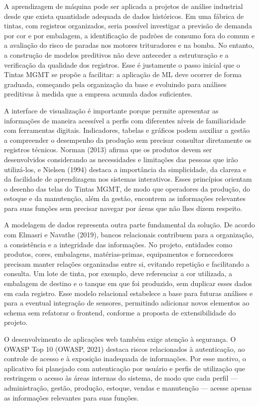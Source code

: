 \documentclass[12pt,a4paper]{article}
\begin{document}
A aprendizagem de máquina pode ser aplicada a projetos de análise industrial desde que exista quantidade adequada de dados históricos. Em uma fábrica de tintas, com registros organizados, seria possível investigar a previsão de demanda por cor e por embalagem, a identificação de padrões de consumo fora do comum e a avaliação do risco de paradas nos motores trituradores e na bomba. No entanto, a construção de modelos preditivos não deve anteceder a estruturação e a verificação da qualidade dos registros. Esse é justamente o passo inicial que o Tintas MGMT se propõe a facilitar: a aplicação de ML deve ocorrer de forma graduada, começando pela organização da base e evoluindo para análises preditivas à medida que a empresa acumula dados suficientes.

A interface de visualização é importante porque permite apresentar as informações de maneira acessível a perfis com diferentes níveis de familiaridade com ferramentas digitais. Indicadores, tabelas e gráficos podem auxiliar a gestão a compreender o desempenho da produção sem precisar consultar diretamente os registros técnicos. Norman (2013) afirma que os produtos devem ser desenvolvidos considerando as necessidades e limitações das pessoas que irão utilizá-los, e Nielsen (1994) destaca a importância da simplicidade, da clareza e da facilidade de aprendizagem nos sistemas interativos. Esses princípios orientam o desenho das telas do Tintas MGMT, de modo que operadores da produção, do estoque e da manutenção, além da gestão, encontrem as informações relevantes para suas funções sem precisar navegar por áreas que não lhes dizem respeito.

A modelagem de dados representa outra parte fundamental da solução. De acordo com Elmasri e Navathe (2019), bancos relacionais contribuem para a organização, a consistência e a integridade das informações. No projeto, entidades como produtos, cores, embalagens, matérias-primas, equipamentos e fornecedores precisam manter relações organizadas entre si, evitando repetição e facilitando a consulta. Um lote de tinta, por exemplo, deve referenciar a cor utilizada, a embalagem de destino e o tanque em que foi produzido, sem duplicar esses dados em cada registro. Esse modelo relacional estabelece a base para futuras análises e para a eventual integração de sensores, permitindo adicionar novos elementos ao schema sem refatorar o frontend, conforme a proposta de extensibilidade do projeto.

O desenvolvimento de aplicações web também exige atenção à segurança. O OWASP Top 10 (OWASP, 2021) destaca riscos relacionados à autenticação, ao controle de acesso e à exposição inadequada de informações. Por esse motivo, o aplicativo foi planejado com autenticação por usuário e perfis de utilização que restringem o acesso às áreas internas do sistema, de modo que cada perfil — administração, gestão, produção, estoque, vendas e manutenção — acesse apenas as informações relevantes para suas funções.
\end{document}

